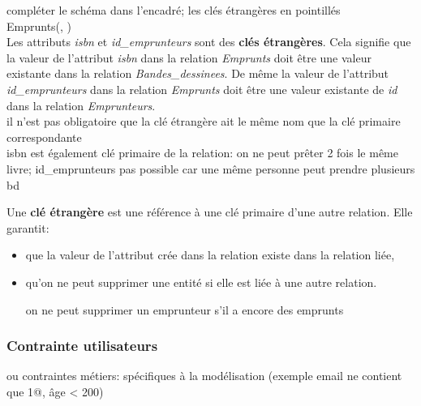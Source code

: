\documentclass[a4paper,11pt]{article}
\begin{document}
\begin{Form}
\begin{commentprof}
compléter le schéma dans l'encadré; les clés étrangères en pointillés\\
Emprunts(\underline{}, )\\
Les attributs \emph{isbn} et \emph{id\_emprunteurs} sont des \textbf{clés étrangères}. Cela signifie que la valeur de l'attribut \emph{isbn} dans la relation \emph{Emprunts} doit être une valeur existante dans la relation \emph{Bandes\_dessinees}. De même la valeur de l'attribut \emph{id\_emprunteurs} dans la relation \emph{Emprunts} doit être une valeur existante  de \emph{id} dans la relation \emph{Emprunteurs}.\\
il n'est pas obligatoire que la clé étrangère ait le même nom que la clé primaire correspondante\\
isbn est également clé primaire de la relation: on ne peut prêter 2 fois le même livre; id\_emprunteurs pas possible car une même personne peut prendre plusieurs bd
\end{commentprof}
\begin{aretenir}[]
Une \textbf{clé étrangère} est une référence à une clé primaire d'une autre relation. Elle garantit:
\begin{itemize}
\item que la valeur de l'attribut crée dans la relation existe dans la relation liée,
\item qu'on ne peut supprimer une entité si elle est liée à une autre relation.
\begin{commentprof}
on ne peut supprimer un emprunteur s'il a encore des emprunts
\end{commentprof}
\end{itemize}
\end{aretenir}
\begin{commentprof}
\subsubsection{Contrainte utilisateurs}
ou contraintes métiers: spécifiques à la modélisation (exemple email ne contient que 1@, âge < 200)
\end{commentprof}

\end{Form}
\end{document}
